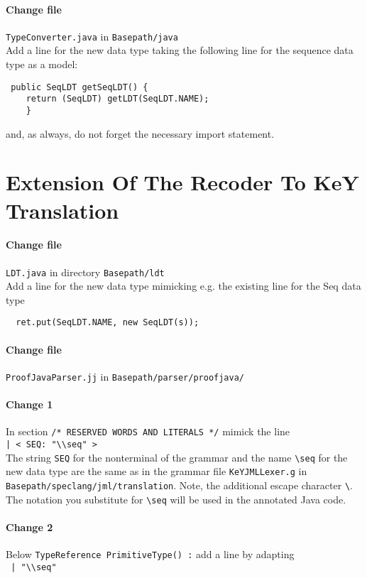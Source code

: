 \documentclass[11pt]{article}
\begin{document}
\paragraph{Change file} \verb+TypeConverter.java+ in \verb+Basepath/java+\\
Add a line for the new data type taking the following line for the sequence data type as a model:
\begin{verbatim}
 public SeqLDT getSeqLDT() {
	return (SeqLDT) getLDT(SeqLDT.NAME);
    }
\end{verbatim}
and, as always, do not forget the necessary import statement.
\section{Extension Of  The Recoder To KeY Translation}
\label{sect:Recoder}


\paragraph{Change file} \verb+LDT.java+ in directory \verb+Basepath/ldt+\\[5pt]
Add a line for the new data type mimicking e.g. the existing line for the Seq data type
\begin{verbatim}
  ret.put(SeqLDT.NAME, new SeqLDT(s));
\end{verbatim}

\paragraph{Change file } \verb+ProofJavaParser.jj+ in 
\verb+Basepath/parser/proofjava/+
\paragraph{\quad Change 1}
In section \verb+/* RESERVED WORDS AND LITERALS */+ mimick the line\\[5pt]
\verb+| < SEQ: "\\seq" >+\\[5pt]
The string \verb+SEQ+ for the  nonterminal of the grammar and the name
\verb+\seq+ for the new data type 
are the same as in the grammar file  \verb+KeYJMLLexer.g+ in \verb+Basepath/speclang/jml/translation+.
Note, the additional escape character \verb+\+.
The notation  you substitute for \verb+\seq+ will be used in the annotated Java code.
\paragraph{\quad Change 2} Below \verb+TypeReference PrimitiveType() :+ add a line by adapting\\[5pt]
\verb+ | "\\seq"+
\end{document}
